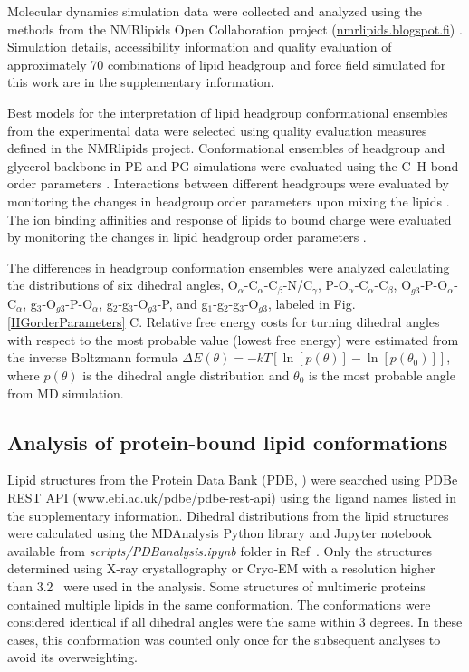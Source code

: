 \documentclass[journal=jpcbfk,manuscript=article]{achemso}
\begin{document}
Molecular dynamics simulation data were collected and analyzed using
the methods from the NMRlipids Open Collaboration project (\url{nmrlipids.blogspot.fi}) \cite{botan15,catte16,ollila16,antila19}.
Simulation details, accessibility information and quality evaluation of approximately 70 combinations of lipid headgroup and force field simulated for this work are in the supplementary information.

Best models for the interpretation of lipid headgroup conformational ensembles from the experimental data were selected
using quality evaluation measures defined in the NMRlipids project.
Conformational ensembles of headgroup and glycerol backbone in PE and PG simulations were evaluated using the C--H bond order parameters \cite{botan15}. Interactions between different headgroups were evaluated by monitoring the changes in headgroup order parameters upon mixing the lipids \cite{antila19}. The ion binding affinities and response of lipids to bound charge were evaluated by monitoring the changes in lipid headgroup order parameters \cite{catte16,antila19}.

The differences in headgroup conformation ensembles were analyzed calculating the distributions of six dihedral angles, O$_\alpha$-C$_\alpha$-C$_\beta$-N/C$_\gamma$, P-O$_\alpha$-C$_\alpha$-C$_\beta$, O$_{g3}$-P-O$_\alpha$-C$_\alpha$, g$_3$-O$_{g3}$-P-O$_\alpha$, g$_2$-g$_3$-O$_{g3}$-P, and g$_1$-g$_2$-g$_3$-O$_{g3}$, labeled in Fig. \ref{HGorderParameters} C. Relative free energy costs for turning dihedral angles with respect to the most probable value (lowest free energy) were estimated from the inverse Boltzmann formula $\Delta E(\theta) = -kT \left[\ln\left[p(\theta)\right]-\ln\left[p(\theta_0)\right] \right]$, where $p(\theta)$ is the dihedral angle distribution and $\theta_0$ is the most probable angle from MD simulation.

\subsection{Analysis of protein-bound lipid conformations}
Lipid structures from the Protein Data Bank (PDB, \cite{berman00})
were searched using PDBe REST API (\url{www.ebi.ac.uk/pdbe/pdbe-rest-api})
using the ligand names listed in the supplementary information.
Dihedral distributions from the lipid structures were calculated
using the MDAnalysis Python library \cite{agrawal11,gowers16} and
Jupyter notebook available from {\it scripts/PDBanalysis.ipynb} folder in Ref~.
Only the structures determined using X-ray crystallography or Cryo-EM with a resolution higher than 3.2~\text{\AA} were used in the analysis. Some structures of multimeric proteins contained multiple lipids in the same conformation. The conformations were considered identical if all dihedral angles were the same within 3 degrees. In these cases, this conformation was counted only once for the subsequent analyses
to avoid its overweighting.
  
\end{document}
